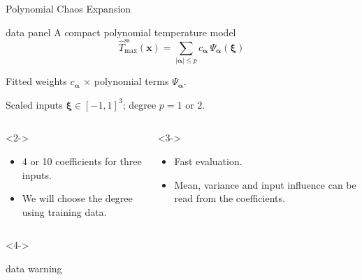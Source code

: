\begin{frame}{Polynomial Chaos Expansion}
  \begin{beamercolorbox}[sep=3mm,wd=\textwidth]{data panel}
    \centering
    \small A compact polynomial temperature model
    \[
      \widehat T_{\max}^{\mathrm{ss}}(\mathbf x)
        =\sum_{|\boldsymbol\alpha|\leq p}c_{\boldsymbol\alpha}\,
          \Psi_{\boldsymbol\alpha}(\boldsymbol\xi)
    \]
    {\footnotesize\color{black!60}Fitted weights $c_{\boldsymbol\alpha}$ $\times$ polynomial terms $\Psi_{\boldsymbol\alpha}$.
    \par Scaled inputs $\boldsymbol\xi\in[-1,1]^3$; degree $p=1$ or $2$.\par}
  \end{beamercolorbox}
  \medskip
  \begin{columns}[T,onlytextwidth]
      \begin{uncoverenv}<2->
      \small
      \begin{itemize}
        \setlength{\itemsep}{1pt}
        \vspace{-1.5mm}
        \item 4 or 10 coefficients for three inputs.
        \item We will choose the degree using training data.
      \end{itemize}
      \vspace{-1.5mm}
      \end{uncoverenv}
      \begin{uncoverenv}<3->
      \small
      \begin{itemize}
        \setlength{\itemsep}{1pt}
        \vspace{-1.5mm}
        \item Fast evaluation.
        \item Mean, variance and input influence can be read from the coefficients.
      \end{itemize}
      \vspace{-1.5mm}
      \end{uncoverenv}
  \end{columns}
  \medskip
  \begin{uncoverenv}<4->
  \begin{beamercolorbox}[sep=1.7mm,wd=\textwidth]{data warning}
    \small
    \begin{itemize}

\end{itemize}
\end{beamercolorbox}
\end{uncoverenv}
\end{frame}
